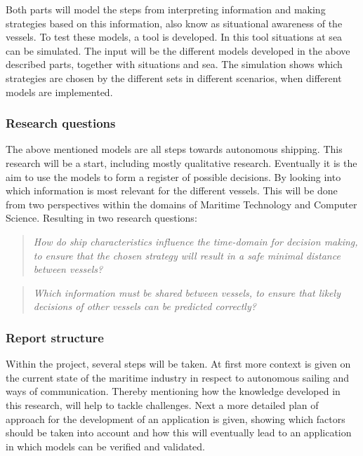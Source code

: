 Both parts will model the steps from interpreting information and making strategies based on this information, also know as situational awareness of the vessels. To test these models, a tool is developed. In this tool situations at sea can be simulated. The input will be the different models developed in the above described parts, together with situations and sea. The simulation shows which strategies are chosen by the different sets in different scenarios, when different models are implemented.


\subsubsection*{Research questions}
The above mentioned models are all steps towards autonomous shipping. This research will be a start, including mostly qualitative research. Eventually it is the aim to use the models to form a register of possible decisions. By looking into which information is most relevant for the different vessels. This will be done from two perspectives within the domains of Maritime Technology and Computer Science. Resulting in two research questions:

\begin{quotation}
	\emph{How do ship characteristics influence the time-domain for decision making, to ensure that the chosen strategy will result in a safe minimal distance between vessels?} 
\end{quotation}

\begin{quotation}
	\emph{Which information must be shared between vessels, to ensure that likely decisions of other vessels can be predicted correctly?}
\end{quotation}

\subsubsection*{Report structure}
Within the project, several steps will be taken. At first more context is given on the current state of the maritime industry in respect to autonomous sailing and ways of communication. Thereby mentioning how the knowledge developed in this research, will help to tackle challenges.
Next a more detailed plan of approach for the development of an application is given, showing which factors should be taken into account and how this will eventually lead to an application in which models can be verified and validated.

